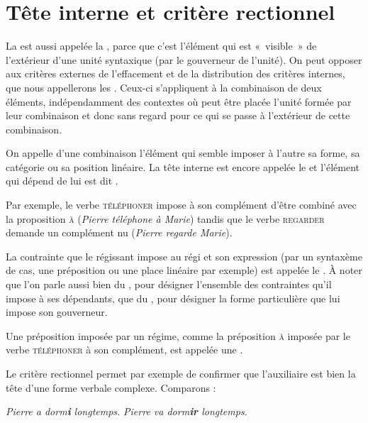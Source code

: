 \section{Tête interne et critère rectionnel}\label{sec:3.3.16}

La  est aussi appelée la , parce que c’est l’élément qui est «~visible~» de l’extérieur d’une unité syntaxique (par le gouverneur de l'unité). On peut opposer aux critères externes de l’effacement et de la distribution des critères internes, que nous appellerons les . Ceux-ci s’appliquent à la combinaison de deux éléments, indépendamment des contextes où peut être placée l’unité formée par leur combinaison et donc sans regard pour ce qui se passe à l’extérieur de cette combinaison.

{On appelle  d’une combinaison l’élément qui semble imposer à l’autre sa forme, sa catégorie ou sa position linéaire. La tête interne est encore appelée le  et l’élément qui dépend de lui est dit .}

Par exemple, le verbe \textsc{téléphoner} impose à son complément d’être combiné avec la proposition \textsc{à} (\textit{Pierre téléphone à Marie}) tandis que le verbe \textsc{regarder} demande un complément nu (\textit{Pierre regarde Marie}).

{La contrainte que le régissant impose au régi et son expression (par un syntaxème de cas, une préposition ou une place linéaire par exemple) est appelée le . À noter que l’on parle aussi bien du , pour désigner l’ensemble des contraintes qu’il impose à ses dépendants, que du , pour désigner la forme particulière que lui impose son gouverneur.}

Une préposition imposée par un régime, comme la préposition \textsc{à} imposée par le verbe \textsc{téléphoner} à son complément, est appelée une .

Le critère rectionnel permet par exemple de confirmer que l’auxiliaire est bien la tête d’une forme verbale complexe. Comparons :

\ea
  \ea \textit{Pierre a dorm\textbf{i}  longtemps.}
  \ex \textit{Pierre va dorm\textbf{ir}  longtemps.}
  \z
\z

